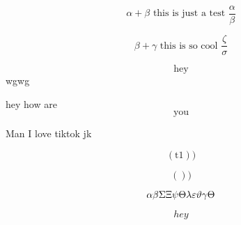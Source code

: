\begin{equation}
  \alpha + \beta \text{ this is just a test } \frac{\alpha}{\beta}
\end{equation}

\begin{equation*}
  \beta + \gamma \text{ this is so cool } \frac{\zeta}{\sigma}
\end{equation*} 

\[\text{hey}\]
wgwg

hey how are \[\text{you}\]

Man I love tiktok jk 

\begin{equation}
 \left(\text{t1}\right))
\end{equation}

\begin{equation}
 \left(\right))
\end{equation}


\begin{equation}
  \alpha \\
  \beta \\
  \Sigma \\
  \Xi \\
  \psi \\
  \Theta \\
  \lambda \\
  \varepsilon \\
  \vartheta \\
  \gamma
  \Theta
\end{equation}

\[hey\]
